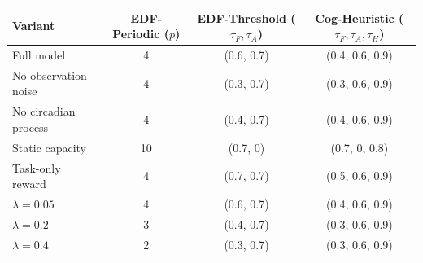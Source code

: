 \begin{tabular}{lccc}
\toprule
Variant & EDF-Periodic ($p$) & EDF-Threshold ($\tau_F,\tau_A$) & Cog-Heuristic ($\tau_F,\tau_A,\tau_H$) \\
\midrule
Full model & 4 & (0.6, 0.7) & (0.4, 0.6, 0.9) \\
No observation noise & 4 & (0.3, 0.7) & (0.3, 0.6, 0.9) \\
No circadian process & 4 & (0.4, 0.7) & (0.4, 0.6, 0.9) \\
Static capacity & 10 & (0.7, 0) & (0.7, 0, 0.8) \\
Task-only reward & 4 & (0.7, 0.7) & (0.5, 0.6, 0.9) \\
$\lambda=0.05$ & 4 & (0.6, 0.7) & (0.4, 0.6, 0.9) \\
$\lambda=0.2$ & 3 & (0.4, 0.7) & (0.3, 0.6, 0.9) \\
$\lambda=0.4$ & 2 & (0.3, 0.7) & (0.3, 0.6, 0.9) \\
\bottomrule
\end{tabular}